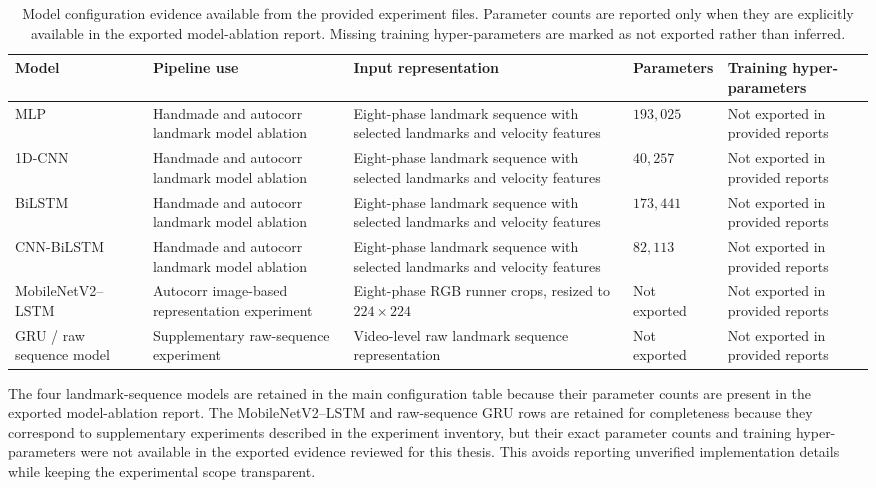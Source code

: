 \begin{table}[htbp]
\centering
\caption{Model configuration evidence available from the provided experiment files. Parameter counts are reported only when they are explicitly available in the exported model-ablation report. Missing training hyper-parameters are marked as not exported rather than inferred.}
\label{tab:model-config}
\renewcommand{\arraystretch}{1.3} %
\small %

\begin{tabularx}{\textwidth}{lXXXX} %
\toprule
Model & Pipeline use & Input representation & Parameters & Training hyper-parameters \\
\midrule
MLP & Handmade and autocorr landmark model ablation & Eight-phase landmark sequence with selected landmarks and velocity features & $193{,}025$ & Not exported in provided reports \\
\addlinespace
1D-CNN & Handmade and autocorr landmark model ablation & Eight-phase landmark sequence with selected landmarks and velocity features & $40{,}257$ & Not exported in provided reports \\
\addlinespace
BiLSTM & Handmade and autocorr landmark model ablation & Eight-phase landmark sequence with selected landmarks and velocity features & $173{,}441$ & Not exported in provided reports \\
\addlinespace
CNN-BiLSTM & Handmade and autocorr landmark model ablation & Eight-phase landmark sequence with selected landmarks and velocity features & $82{,}113$ & Not exported in provided reports \\
\addlinespace
MobileNetV2--LSTM & Autocorr image-based representation experiment & Eight-phase RGB runner crops, resized to $224\times224$ & Not exported & Not exported in provided reports \\
\addlinespace
GRU / raw sequence model & Supplementary raw-sequence experiment & Video-level raw landmark sequence representation & Not exported & Not exported in provided reports \\
\bottomrule
\end{tabularx}
\end{table}

The four landmark-sequence models are retained in the main configuration table
because their parameter counts are present in the exported model-ablation report.
The MobileNetV2--LSTM and raw-sequence GRU rows are retained for completeness
because they correspond to supplementary experiments described in the experiment
inventory, but their exact parameter counts and training hyper-parameters were
not available in the exported evidence reviewed for this thesis. This avoids
reporting unverified implementation details while keeping the experimental scope
transparent.

